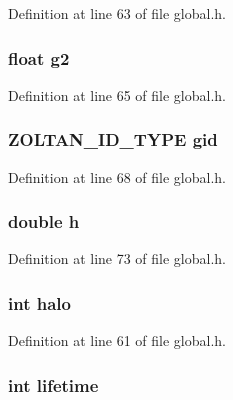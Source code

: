 Definition at line 63 of file global.\-h.

\hypertarget{structcellData_aee9971139118d56815564304450c4775}{
\subsubsection[{g2}]{\setlength{\rightskip}{0pt plus 5cm}float g2}}\label{structcellData_aee9971139118d56815564304450c4775}


Definition at line 65 of file global.\-h.

\hypertarget{structcellData_abb4d4bd9231e9f994e87f32cc4fcfce8}{
\subsubsection[{gid}]{\setlength{\rightskip}{0pt plus 5cm}Z\-O\-L\-T\-A\-N\-\_\-\-I\-D\-\_\-\-T\-Y\-P\-E gid}}\label{structcellData_abb4d4bd9231e9f994e87f32cc4fcfce8}


Definition at line 68 of file global.\-h.

\hypertarget{structcellData_a8ee9be1b5aa75abae556de3088cba6d9}{
\subsubsection[{h}]{\setlength{\rightskip}{0pt plus 5cm}double h}}\label{structcellData_a8ee9be1b5aa75abae556de3088cba6d9}


Definition at line 73 of file global.\-h.

\hypertarget{structcellData_a80ff3fcc4d03d0b1b01559839d12df5b}{
\subsubsection[{halo}]{\setlength{\rightskip}{0pt plus 5cm}int halo}}\label{structcellData_a80ff3fcc4d03d0b1b01559839d12df5b}


Definition at line 61 of file global.\-h.

\hypertarget{structcellData_ada4af333b662b0bba80e2f5e273fe4ea}{
\subsubsection[{lifetime}]{\setlength{\rightskip}{0pt plus 5cm}int lifetime}}\label{structcellData_ada4af333b662b0bba80e2f5e273fe4ea}


